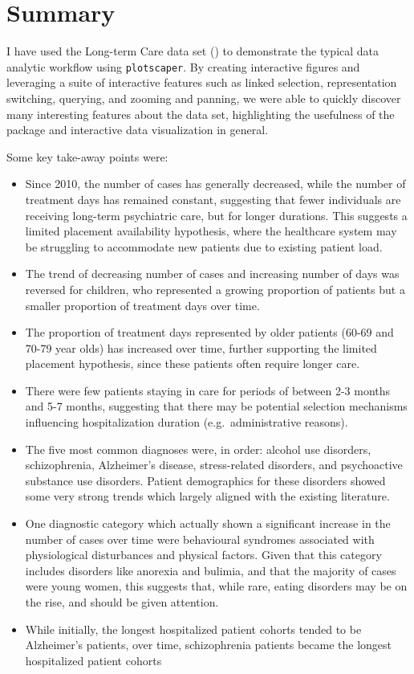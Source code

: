 \documentclass[
]{book}
\providecommand{\tightlist}{%
  \setlength{\itemsep}{0pt}\setlength{\parskip}{0pt}}
\theoremstyle{definition}
\theoremstyle{definition}
\theoremstyle{definition}
\theoremstyle{definition}
\theoremstyle{remark}
\begin{document}
\section{Summary}\label{summary}

I have used the Long-term Care data set () to demonstrate the typical data analytic workflow using \texttt{plotscaper}. By creating interactive figures and leveraging a suite of interactive features such as linked selection, representation switching, querying, and zooming and panning, we were able to quickly discover many interesting features about the data set, highlighting the usefulness of the package and interactive data visualization in general.

Some key take-away points were:

\begin{itemize}
\tightlist
\item
  Since 2010, the number of cases has generally decreased, while the number of treatment days has remained constant, suggesting that fewer individuals are receiving long-term psychiatric care, but for longer durations. This suggests a limited placement availability hypothesis, where the healthcare system may be struggling to accommodate new patients due to existing patient load.
\item
  The trend of decreasing number of cases and increasing number of days was reversed for children, who represented a growing proportion of patients but a smaller proportion of treatment days over time.
\item
  The proportion of treatment days represented by older patients (60-69 and 70-79 year olds) has increased over time, further supporting the limited placement hypothesis, since these patients often require longer care.
\item
  There were few patients staying in care for periods of between 2-3 months and 5-7 months, suggesting that there may be potential selection mechanisms influencing hospitalization duration (e.g.~administrative reasons).
\item
  The five most common diagnoses were, in order: alcohol use disorders, schizophrenia, Alzheimer's disease, stress-related disorders, and psychoactive substance use disorders. Patient demographics for these disorders showed some very strong trends which largely aligned with the existing literature.
\item
  One diagnostic category which actually shown a significant increase in the number of cases over time were behavioural syndromes associated with physiological disturbances and physical factors. Given that this category includes disorders like anorexia and bulimia, and that the majority of cases were young women, this suggests that, while rare, eating disorders may be on the rise, and should be given attention.
\item
  While initially, the longest hospitalized patient cohorts tended to be Alzheimer's patients, over time, schizophrenia patients became the longest hospitalized patient cohorts
\end{itemize}
\end{document}
